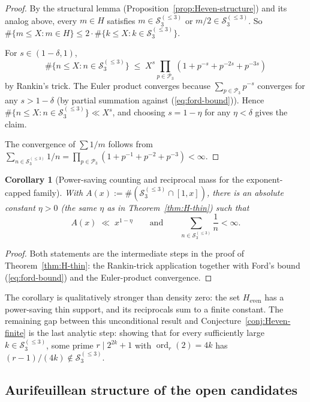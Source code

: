 \documentclass[11pt]{amsart}
\theoremstyle{plain}
\newtheorem{corollary}[theorem]{Corollary}
\theoremstyle{definition}
\begin{document}
\begin{proof}
By the structural lemma (Proposition~\ref{prop:Heven-structure}) and
its analog above, every $m \in H$ satisfies $m \in \mathcal{S}_3^{(\le 3)}$
or $m/2 \in \mathcal{S}_3^{(\le 3)}$. So
$\#\{m \le X : m \in H\} \le 2 \cdot \#\{k \le X : k \in
\mathcal{S}_3^{(\le 3)}\}$.

For $s \in (1-\delta, 1)$,
\[
\#\{n \le X : n \in \mathcal{S}_3^{(\le 3)}\}
\;\le\; X^s \prod_{p \in \mathcal{P}_3} (1 + p^{-s} + p^{-2s} + p^{-3s})
\]
by Rankin's trick. The Euler product converges because $\sum_{p \in
\mathcal{P}_3} p^{-s}$ converges for any $s > 1-\delta$ (by partial
summation against (\ref{eq:ford-bound})). Hence
$\#\{n \le X : n \in \mathcal{S}_3^{(\le 3)}\} \ll X^s$, and choosing
$s = 1 - \eta$ for any $\eta < \delta$ gives the claim.

The convergence of $\sum 1/m$ follows from
$\sum_{n \in \mathcal{S}_3^{(\le 3)}} 1/n =
\prod_{p \in \mathcal{P}_3}(1 + p^{-1} + p^{-2} + p^{-3}) < \infty$.
\end{proof}

\begin{corollary}[Power-saving counting and reciprocal mass for the exponent-capped family]\label{cor:A-bound}
With $A(x) := \#(\mathcal{S}_3^{(\le 3)} \cap [1, x])$, there is an absolute
constant $\eta > 0$ (the same $\eta$ as in
Theorem~\ref{thm:H-thin}) such that
\[
A(x) \;\ll\; x^{1-\eta}
\qquad \text{and} \qquad
\sum_{n \in \mathcal{S}_3^{(\le 3)}} \frac{1}{n} < \infty.
\]
\end{corollary}

\begin{proof}
Both statements are the intermediate steps in the proof of
Theorem~\ref{thm:H-thin}: the Rankin-trick application together with
Ford's bound (\ref{eq:ford-bound}) and the Euler-product convergence.
\end{proof}

The corollary is qualitatively stronger than density zero: the set
$H_{\mathrm{even}}$ has a power-saving thin support, and its
reciprocals sum to a finite constant. The remaining gap between this
unconditional result and Conjecture~\ref{conj:Heven-finite} is the
last analytic step: showing that for every sufficiently large
$k \in \mathcal{S}_3^{(\le 3)}$, some prime $r \mid 2^{2k}+1$ with
$\operatorname{ord}_r(2) = 4k$ has $(r-1)/(4k) \notin \mathcal{S}_3^{(\le 3)}$.

\subsection{Aurifeuillean structure of the open candidates}\label{sec:Aurifeuillean}
\end{document}
